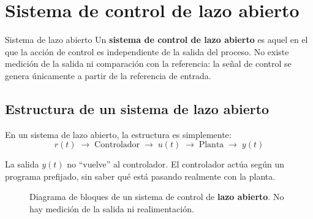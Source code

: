 \section{Sistema de control de lazo abierto}
\label{sec:intro-lazo-abierto}

\begin{definicion}{Sistema de lazo abierto}
  Un \textbf{sistema de control de lazo abierto} es aquel en el que la acción
  de control es independiente de la salida del proceso. No existe medición
  de la salida ni comparación con la referencia: la señal de control se genera
  únicamente a partir de la referencia de entrada.
\end{definicion}

\subsection{Estructura de un sistema de lazo abierto}

En un sistema de lazo abierto, la estructura es simplemente:
\begin{equation}
  r(t) \;\longrightarrow\; \boxed{\text{Controlador}} \;\longrightarrow\;
  u(t) \;\longrightarrow\; \boxed{\text{Planta}} \;\longrightarrow\; y(t)
\end{equation}

La salida $y(t)$ no ``vuelve'' al controlador. El controlador actúa según un
programa prefijado, sin saber qué está pasando realmente con la planta.

\begin{figure}[htbp]
  \centering
  \caption{Diagrama de bloques de un sistema de control de \textbf{lazo abierto}.
           No hay medición de la salida ni realimentación.}
  \label{fig:lazo-abierto}
\end{figure}

